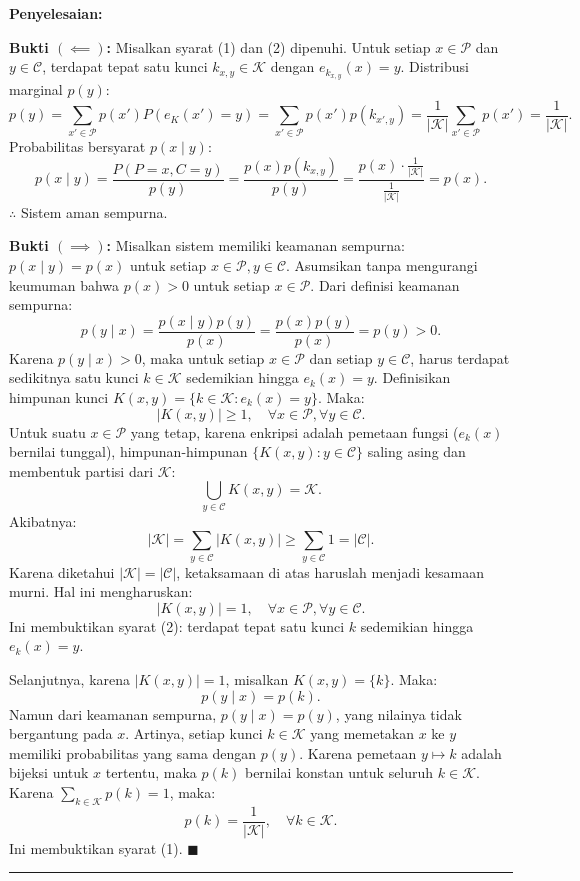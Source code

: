 \documentclass[11pt,a4paper]{article}
\newenvironment{solusi}{\noindent\textbf{\textsf{Penyelesaian:}}\par\vspace{0.2em}}{\hfill$\blacksquare$\vspace{1em}\par\hrule\vspace{1em}}
\begin{document}
\begin{solusi}
\textbf{Bukti $(\impliedby)$:}
Misalkan syarat (1) dan (2) dipenuhi.
Untuk setiap $x \in \mathcal{P}$ dan $y \in \mathcal{C}$, terdapat tepat satu kunci $k_{x, y} \in \mathcal{K}$ dengan $e_{k_{x, y}}(x) = y$.
Distribusi marginal $p(y)$:
\[
p(y) = \sum_{x' \in \mathcal{P}} p(x') P(e_K(x') = y) = \sum_{x' \in \mathcal{P}} p(x') p(k_{x', y}) = \frac{1}{|\mathcal{K}|} \sum_{x' \in \mathcal{P}} p(x') = \frac{1}{|\mathcal{K}|}.
\]
Probabilitas bersyarat $p(x \mid y)$:
\[
p(x \mid y) = \frac{P(P=x, C=y)}{p(y)} = \frac{p(x) p(k_{x, y})}{p(y)} = \frac{p(x) \cdot \frac{1}{|\mathcal{K}|}}{\frac{1}{|\mathcal{K}|}} = p(x).
\]
$\therefore$ Sistem aman sempurna.

\textbf{Bukti $(\implies)$:}
Misalkan sistem memiliki keamanan sempurna: $p(x \mid y) = p(x)$ untuk setiap $x \in \mathcal{P}, y \in \mathcal{C}$.
Asumsikan tanpa mengurangi keumuman bahwa $p(x) > 0$ untuk setiap $x \in \mathcal{P}$.
Dari definisi keamanan sempurna:
\[
p(y \mid x) = \frac{p(x \mid y) p(y)}{p(x)} = \frac{p(x) p(y)}{p(x)} = p(y) > 0.
\]
Karena $p(y \mid x) > 0$, maka untuk setiap $x \in \mathcal{P}$ dan setiap $y \in \mathcal{C}$, harus terdapat sedikitnya satu kunci $k \in \mathcal{K}$ sedemikian hingga $e_k(x) = y$.
Definisikan himpunan kunci $K(x, y) = \{k \in \mathcal{K} : e_k(x) = y\}$. Maka:
\[
|K(x, y)| \ge 1, \quad \forall x \in \mathcal{P}, \forall y \in \mathcal{C}.
\]
Untuk suatu $x \in \mathcal{P}$ yang tetap, karena enkripsi adalah pemetaan fungsi ($e_k(x)$ bernilai tunggal), himpunan-himpunan $\{K(x, y) : y \in \mathcal{C}\}$ saling asing dan membentuk partisi dari $\mathcal{K}$:
\[
\bigcup_{y \in \mathcal{C}} K(x, y) = \mathcal{K}.
\]
Akibatnya:
\[
|\mathcal{K}| = \sum_{y \in \mathcal{C}} |K(x, y)| \ge \sum_{y \in \mathcal{C}} 1 = |\mathcal{C}|.
\]
Karena diketahui $|\mathcal{K}| = |\mathcal{C}|$, ketaksamaan di atas haruslah menjadi kesamaan murni. Hal ini mengharuskan:
\[
|K(x, y)| = 1, \quad \forall x \in \mathcal{P}, \forall y \in \mathcal{C}.
\]
Ini membuktikan syarat (2): terdapat tepat satu kunci $k$ sedemikian hingga $e_k(x) = y$.

Selanjutnya, karena $|K(x, y)| = 1$, misalkan $K(x, y) = \{k\}$. Maka:
\[
p(y \mid x) = p(k).
\]
Namun dari keamanan sempurna, $p(y \mid x) = p(y)$, yang nilainya tidak bergantung pada $x$.
Artinya, setiap kunci $k \in \mathcal{K}$ yang memetakan $x$ ke $y$ memiliki probabilitas yang sama dengan $p(y)$.
Karena pemetaan $y \mapsto k$ adalah bijeksi untuk $x$ tertentu, maka $p(k)$ bernilai konstan untuk seluruh $k \in \mathcal{K}$.
Karena $\sum_{k \in \mathcal{K}} p(k) = 1$, maka:
\[
p(k) = \frac{1}{|\mathcal{K}|}, \quad \forall k \in \mathcal{K}.
\]
Ini membuktikan syarat (1).
\end{solusi}
\end{document}
